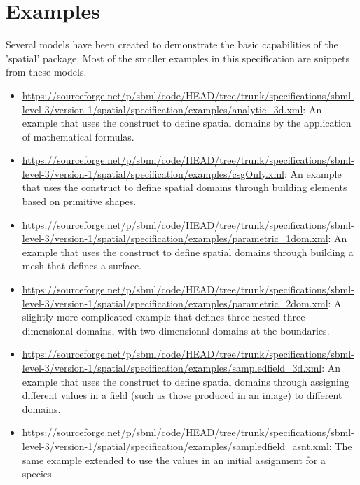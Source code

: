 
\section{Examples}
\label{examples}

\begin{blockChanged}
Several models have been created to demonstrate the basic capabilities of the 'spatial' package.  Most of the smaller examples in this specification are snippets from these models.

\begin{itemize}
  
\item \url{https://sourceforge.net/p/sbml/code/HEAD/tree/trunk/specifications/sbml-level-3/version-1/spatial/specification/examples/analytic_3d.xml}: An example that uses the \AnalyticGeometry construct to define spatial domains by the application of mathematical formulas.

\item \url{https://sourceforge.net/p/sbml/code/HEAD/tree/trunk/specifications/sbml-level-3/version-1/spatial/specification/examples/csgOnly.xml}: An example that uses the \CSGeometry construct to define spatial domains through building elements based on primitive shapes.

\item \url{https://sourceforge.net/p/sbml/code/HEAD/tree/trunk/specifications/sbml-level-3/version-1/spatial/specification/examples/parametric_1dom.xml}: An example that uses the \ParametricGeometry construct to define spatial domains through building a mesh that defines a surface.

\item \url{https://sourceforge.net/p/sbml/code/HEAD/tree/trunk/specifications/sbml-level-3/version-1/spatial/specification/examples/parametric_2dom.xml}: A slightly more complicated \ParametricGeometry example that defines three nested three-dimensional domains, with two-dimensional domains at the boundaries.

\item \url{https://sourceforge.net/p/sbml/code/HEAD/tree/trunk/specifications/sbml-level-3/version-1/spatial/specification/examples/sampledfield_3d.xml}: An example that uses the \SampledFieldGeometry construct to define spatial domains through assigning different values in a field (such as those produced in an image) to different domains.

\item \url{https://sourceforge.net/p/sbml/code/HEAD/tree/trunk/specifications/sbml-level-3/version-1/spatial/specification/examples/sampledfield_asnt.xml}: The same \SampledFieldGeometry example extended to use the \SampledField values in an initial assignment for a species.

\end{itemize}
\end{blockChanged}
